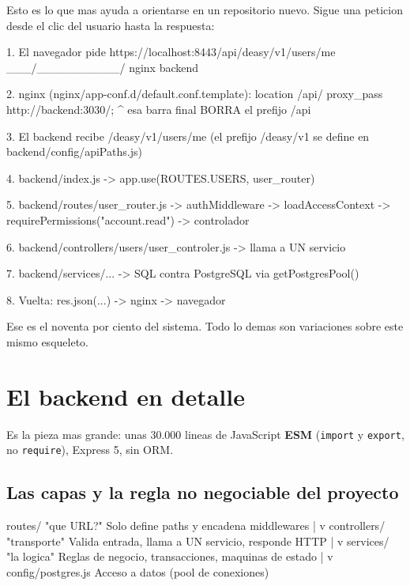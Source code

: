 \documentclass[11pt,a4paper,oneside]{report}
\newcommand{\rt}[1]{\texttt{#1}}
\begin{document}
Esto es lo que mas ayuda a orientarse en un repositorio nuevo. Sigue una peticion desde el
clic del usuario hasta la respuesta:

\begin{diagrama}
1. El navegador pide  https://localhost:8443/api/deasy/v1/users/me
                                             \___/\__________/
                                             nginx    backend

2. nginx (nginx/app-conf.d/default.conf.template):
   location /api/ { proxy_pass http://backend:3030/; }
                                                   ^
                           esa barra final BORRA el prefijo /api

3. El backend recibe   /deasy/v1/users/me
   (el prefijo /deasy/v1 se define en backend/config/apiPaths.js)

4. backend/index.js  ->  app.use(ROUTES.USERS, user_router)

5. backend/routes/user_router.js  ->  authMiddleware
                                  ->  loadAccessContext
                                  ->  requirePermissions("account.read")
                                  ->  controlador

6. backend/controllers/users/user_controler.js  ->  llama a UN servicio

7. backend/services/...  ->  SQL contra PostgreSQL via getPostgresPool()

8. Vuelta:  res.json({...})  ->  nginx  ->  navegador
\end{diagrama}

Ese es el noventa por ciento del sistema. Todo lo demas son variaciones sobre este mismo
esqueleto.

\chapter{El backend en detalle}

Es la pieza mas grande: unas 30.000 lineas de JavaScript \textbf{ESM} (\rt{import} y
\rt{export}, no \rt{require}), Express 5, sin ORM.

\section{Las capas y la regla no negociable del proyecto}

\begin{diagrama}
routes/       "que URL?"       Solo define paths y encadena middlewares
   |
   v
controllers/  "transporte"     Valida entrada, llama a UN servicio, responde HTTP
   |
   v
services/     "la logica"      Reglas de negocio, transacciones, maquinas de estado
   |
   v
config/postgres.js             Acceso a datos (pool de conexiones)
\end{diagrama}
\end{document}

